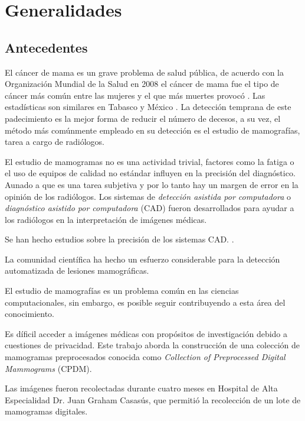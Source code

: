 \chapter{Generalidades}

 \setcounter{page}{1}

\section{Antecedentes}

El cáncer de mama es un grave problema de salud pública, de acuerdo con la
Organización Mundial de la Salud en 2008 el cáncer de mama fue el tipo de
cáncer más común entre las mujeres y el que más muertes provocó
\cite{cancerreport}. Las estadísticas son similares en Tabasco y México
\cite{inegi, mxcancer}. La detección temprana de este padecimiento es la mejor
forma de reducir el número de decesos, a su vez, el método más comúnmente
empleado en su detección es el estudio de mamografías, tarea a cargo de
radiólogos.

El estudio de mamogramas no es una actividad trivial, factores como la fatiga o
el uso de equipos de calidad no estándar influyen en la precisión del
diagnóstico.  Aunado a que es una tarea subjetiva y por lo tanto hay un margen
de error en la opinión de los radiólogos. Los sistemas de \textit{detección
asistida por computadora} o \textit{diagnóstico asistido por computadora} (CAD)
fueron desarrollados para ayudar a los radiólogos en la interpretación de
imágenes médicas. 

Se han hecho estudios sobre la precisión de los sistemas CAD.
\cite{fenton2007influence}.

La comunidad científica ha hecho un esfuerzo considerable para la detección
automatizada de lesiones mamográficas. 

El estudio de mamografías es un problema común en las ciencias computacionales,
sin embargo, es posible seguir contribuyendo a esta área del conocimiento.

Es díficil acceder a imágenes médicas con propósitos de investigación debido a
cuestiones de privacidad. Este trabajo aborda la construcción de una colección
de mamogramas preprocesados conocida como \textit{Collection of Preprocessed
Digital Mammograms} (CPDM).

Las imágenes fueron recolectadas durante cuatro meses en Hospital de Alta
Especialidad Dr. Juan Graham Casasús, que permitió la recolección de un lote de
mamogramas digitales.

